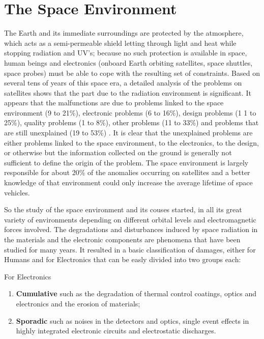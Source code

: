 \documentclass[./dissertation.tex]{subfiles}
\begin{document}
\section{The Space Environment}
The Earth and its immediate surroundings are protected by the atmosphere, which acts as a semi-permeable shield letting through light and heat while stopping radiation and UV's; because no such protection is available in space, human beings and electronics (onboard Earth orbiting satellites, space shuttles, space probes) must be able to cope with the resulting set of constraints. Based on several tens  of years of this  space  era, a detailed analysis of the problems on satellites shows that the part due to the radiation  environment  is  significant. It appears  that  the malfunctions   are   due to problems   linked to the   space environment (9 to 21\%), electronic  problems (6 to 16\%), design  problems (1 1  to 25\%), quality  problems  (1 to 8\%), other   problems (11  to   33\%) and  problems   that are still unexplained (19 to  53\%) \cite{bib2}.  It is clear  that the unexplained problems  are either problems  linked to the space environment, to the electronics, to   the design, or otherwise   but   the information  collected  on  the  ground is generally not sufficient to define the origin  of  the  problem. The space environment is largely  responsible   for   about 20\% of the anomalies  occurring  on  satellites  and a  better  knowledge of that  environment  could  only  increase  the  average lifetime of space vehicles.

So the study of the space environment and its couses started, in all its great variety of environments depending on different orbital levels and electromagnetic forces involved. The  degradations  and  disturbances induced by space radiation in the materials  and the  electronic  components are phenomena that  have  been  studied for many  years.\cite{bib2} It resulted in a basic classification of damages, either for Humans and for Electronics that can be easly divided into two groups each:

For Electronics
\begin{enumerate}
    \item \textbf{Cumulative}  such  as the degradation  of thermal control coatings, optics  and  electronics  and  the  erosion  of materials;
    \item \textbf{Sporadic}  such as noises in the  detectors  and optics,   single  event  effects in highly  integrated  electronic circuits and electrostatic discharges.
\end{enumerate}
\end{document}
